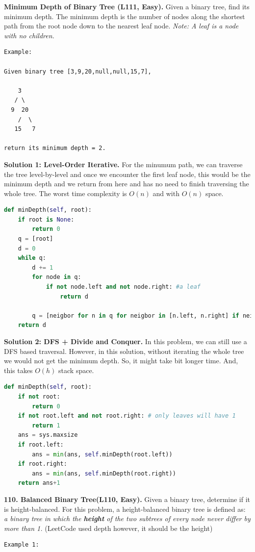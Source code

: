 \documentclass[../main.tex]{subfiles}
\begin{document}
\begin{examples}[resume]

\item  \textbf{Minimum Depth of Binary Tree (L111, Easy).} Given a binary tree, find its minimum depth. The minimum depth is the number of nodes along the shortest path from the root node down to the nearest leaf node. \textit{Note: A leaf is a node with no children.}
\begin{lstlisting}
Example:

Given binary tree [3,9,20,null,null,15,7],

    3
   / \
  9  20
    /  \
   15   7

return its minimum depth = 2.
\end{lstlisting}
\textbf{Solution 1: Level-Order Iterative.} For the minumum path, we can traverse the tree level-by-level and once we encounter the first leaf node, this would be the minimum depth and we return from here and has no need to finish traversing the whole tree. The worst time complexity is $O(n)$ and with $O(n)$ space.
\begin{lstlisting}[language=Python]
def minDepth(self, root):
    if root is None:
        return 0
    q = [root]
    d = 0
    while q:
        d += 1
        for node in q:
            if not node.left and not node.right: #a leaf
                return d

        q = [neigbor for n in q for neigbor in [n.left, n.right] if neigbor]           
    return d
\end{lstlisting}
\textbf{Solution 2: DFS + Divide and Conquer.} In this problem, we can still use a DFS based traversal. However, in this solution, without iterating the whole tree we would not get the minimum depth. So, it might take bit longer time. And, this takes $O(h)$ stack space. 
\begin{lstlisting}[language=Python]
def minDepth(self, root):
    if not root:
        return 0
    if not root.left and not root.right: # only leaves will have 1
        return 1
    ans = sys.maxsize
    if root.left:
        ans = min(ans, self.minDepth(root.left))
    if root.right:
        ans = min(ans, self.minDepth(root.right))
    return ans+1
\end{lstlisting}
\item \textbf{110. Balanced Binary Tree(L110, Easy).} Given a binary tree, determine if it is height-balanced. For this problem, a height-balanced binary tree is defined as: \textit{a binary tree in which the \textbf{height} of the two subtrees of every node never differ by more than 1.} (LeetCode used depth however, it should be the height)
\begin{lstlisting}[numbers=none]
Example 1:


\end{lstlisting}
\end{examples}
\end{document}
